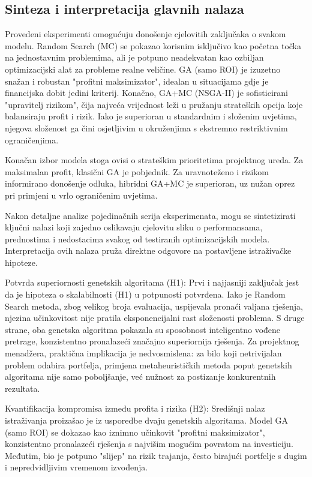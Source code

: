 \subsection{Sinteza i interpretacija glavnih nalaza}
Provedeni eksperimenti omogućuju donošenje cjelovitih zaključaka o svakom modelu. Random Search (MC) se pokazao korisnim isključivo kao početna točka na jednostavnim problemima, ali je potpuno neadekvatan kao ozbiljan optimizacijski alat za probleme realne veličine. GA (samo ROI) je izuzetno snažan i robustan "profitni maksimizator", idealan u situacijama gdje je financijska dobit jedini kriterij. Konačno, GA+MC (NSGA-II) je sofisticirani "upravitelj rizikom", čija najveća vrijednost leži u pružanju strateških opcija koje balansiraju profit i rizik. Iako je superioran u standardnim i složenim uvjetima, njegova složenost ga čini osjetljivim u okruženjima s ekstremno restriktivnim ograničenjima.

Konačan izbor modela stoga ovisi o strateškim prioritetima projektnog ureda. Za maksimalan profit, klasični GA je pobjednik. Za uravnoteženo i rizikom informirano donošenje odluka, hibridni GA+MC je superioran, uz nužan oprez pri primjeni u vrlo ograničenim uvjetima.


Nakon detaljne analize pojedinačnih serija eksperimenata, mogu se sintetizirati ključni nalazi koji zajedno oslikavaju cjelovitu sliku o performansama, prednostima i nedostacima svakog od testiranih optimizacijskih modela. Interpretacija ovih nalaza pruža direktne odgovore na postavljene istraživačke hipoteze.

Potvrda superiornosti genetskih algoritama (H1):
Prvi i najjasniji zaključak jest da je hipoteza o skalabilnosti (H1) u potpunosti potvrđena. Iako je Random Search metoda, zbog velikog broja evaluacija, uspijevala pronaći valjana rješenja, njezina učinkovitost nije pratila eksponencijalni rast složenosti problema. S druge strane, oba genetska algoritma pokazala su sposobnost inteligentno vođene pretrage, konzistentno pronalazeći značajno superiornija rješenja. Za projektnog menadžera, praktična implikacija je nedvosmislena: za bilo koji netrivijalan problem odabira portfelja, primjena metaheurističkih metoda poput genetskih algoritama nije samo poboljšanje, već nužnost za postizanje konkurentnih rezultata.

Kvantifikacija kompromisa između profita i rizika (H2):
Središnji nalaz istraživanja proizašao je iz usporedbe dvaju genetskih algoritama. Model GA (samo ROI) se dokazao kao iznimno učinkovit "profitni maksimizator", konzistentno pronalazeći rješenja s najvišim mogućim povratom na investiciju. Međutim, bio je potpuno "slijep" na rizik trajanja, često birajući portfelje s dugim i nepredvidljivim vremenom izvođenja.

